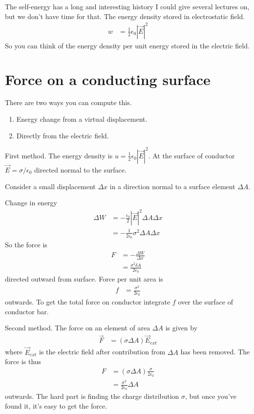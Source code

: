 The self-energy has a long and interesting history I could give several lectures
on, but we don't have time for that.
The energy density stored in electrostatic field.
\begin{align}
    w &=
    \frac{1}{2}
    \epsilon_0
    \left| \vec{E} \right|^2
\end{align}
So you can think of the energy density per unit energy stored in the electric
field.

\section{Force on a conducting surface}
There are two ways you can compute this.
\begin{enumerate}
    \item Energy change from a virtual displacement.
    \item Directly from the electric field.
\end{enumerate}

First method.
The energy density is $u = \frac{1}{2} \epsilon_0 \left| \vec{E} \right|^2$.
At the surface of conductor $\vec{E} = \sigma/\epsilon_0$
directed normal to the surface.

Consider a small displacement $\Delta x$ in a direction normal to a surface
element $\Delta A$.

Change in energy
\begin{align}
    \Delta W &=
    -\frac{\epsilon_0}{2}
    |\vec{E}|^2 \Delta A \Delta x\\
    &=
    -\frac{1}{2\epsilon_0} \sigma^2 \Delta A \Delta x
\end{align}
So the force is
\begin{align}
    F &=
    -\frac{\Delta W}{\Delta x}\\
    &=
    \frac{\sigma^2 \delta A}{2\epsilon_0}
\end{align}
directed outward from surface.
Force per unit area is
\begin{align}
    f &=
    \frac{\sigma^2}{2\epsilon_0}
\end{align}
outwards.
To get the total force on conductor integrate $f$ over the surface of conductor
bar.

Second method.
The force on an element of area $\Delta A$
is given by
\begin{align}
    \vec{F} &=
    \left( \sigma \Delta A \right)\vec{E}_{ext}
\end{align}
where $\vec{E}_{ext}$ is the electric field after contribution from $\Delta A$
has been removed.
The force is thus
\begin{align}
    F &=
    \left( \sigma \Delta A \right)
    \frac{\sigma}{2\epsilon_0}\\
    &=
    \frac{\sigma^2}{2\epsilon_0} \Delta A
\end{align}
outwards.
The hard part is finding the charge distribution $\sigma$,
but once you've found it,
it's easy to get the force.

